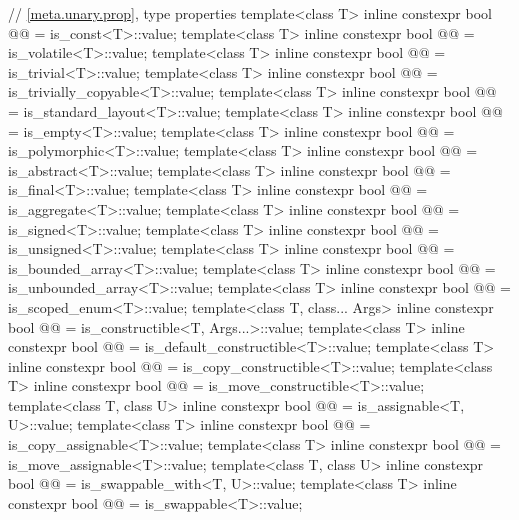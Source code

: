 \begin{codeblock}
{  // \ref{meta.unary.prop}, type properties
  template<class T>
    inline constexpr bool @@ = is_const<T>::value;
  template<class T>
    inline constexpr bool @@ = is_volatile<T>::value;
  template<class T>
    inline constexpr bool @@ = is_trivial<T>::value;
  template<class T>
    inline constexpr bool @@ = is_trivially_copyable<T>::value;
  template<class T>
    inline constexpr bool @@ = is_standard_layout<T>::value;
  template<class T>
    inline constexpr bool @@ = is_empty<T>::value;
  template<class T>
    inline constexpr bool @@ = is_polymorphic<T>::value;
  template<class T>
    inline constexpr bool @@ = is_abstract<T>::value;
  template<class T>
    inline constexpr bool @@ = is_final<T>::value;
  template<class T>
    inline constexpr bool @@ = is_aggregate<T>::value;
  template<class T>
    inline constexpr bool @@ = is_signed<T>::value;
  template<class T>
    inline constexpr bool @@ = is_unsigned<T>::value;
  template<class T>
    inline constexpr bool @@ = is_bounded_array<T>::value;
  template<class T>
    inline constexpr bool @@ = is_unbounded_array<T>::value;
  template<class T>
    inline constexpr bool @@ = is_scoped_enum<T>::value;
  template<class T, class... Args>
    inline constexpr bool @@ = is_constructible<T, Args...>::value;
  template<class T>
    inline constexpr bool @@ = is_default_constructible<T>::value;
  template<class T>
    inline constexpr bool @@ = is_copy_constructible<T>::value;
  template<class T>
    inline constexpr bool @@ = is_move_constructible<T>::value;
  template<class T, class U>
    inline constexpr bool @@ = is_assignable<T, U>::value;
  template<class T>
    inline constexpr bool @@ = is_copy_assignable<T>::value;
  template<class T>
    inline constexpr bool @@ = is_move_assignable<T>::value;
  template<class T, class U>
    inline constexpr bool @@ = is_swappable_with<T, U>::value;
  template<class T>
    inline constexpr bool @@ = is_swappable<T>::value;
}
\end{codeblock}
